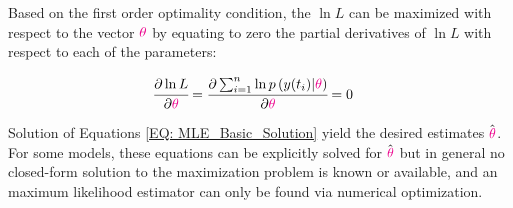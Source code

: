 \documentclass[../Article_Model_Parameters.tex]{subfiles}
\begin{document}
	Based on the first order optimality condition, the $\ln L$ can be maximized with respect to the vector ${\color{magenta} \theta}$ by equating to zero the partial derivatives of $\ln L$ with respect to each of the parameters:
		
	{\footnotesize
		\begin{align}\label{EQ: MLE_Basic_Solution}
			\cfrac{\partial \ln L}{\partial {\color{magenta} \theta}} &= \cfrac{\partial \sum_{i=1}^{n} \ln p\left( y(t_i) | {\color{magenta} \theta} \right) }{\partial {\color{magenta} \theta}} = 0 
	\end{align} }
		
	Solution of Equations \ref{EQ: MLE_Basic_Solution} yield the desired estimates $\hat{{\color{magenta} \theta}}$. For some models, these equations can be explicitly solved for $\hat{{\color{magenta} \theta}}$ but in general no closed-form solution to the maximization problem is known or available, and an maximum likelihood estimator can only be found via numerical optimization.
		
		
\end{document}
